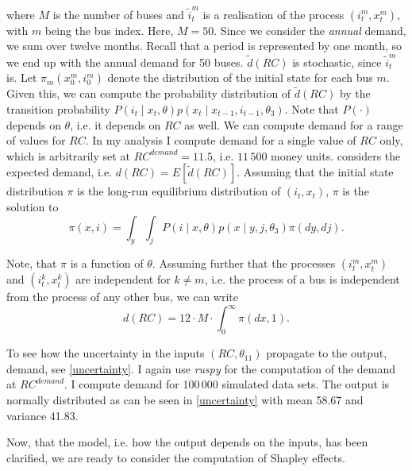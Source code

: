\noindent where $M$ is the number of buses and ${\tilde{i}}_t^m$ is a realisation of the process $(i_t^m, x_t^m)$, with $m$ being the bus index. Here, $M=50$. Since we consider the \textit{annual} demand, we sum over twelve months. Recall that a period is represented by one month, so we end up with the annual demand for 50 buses. $\tilde{d}(RC)$ is stochastic, since ${\tilde{i}}_t^m$ is. Let $\pi_m(x_0^m, i_0^m)$ denote the distribution of the initial state for each bus $m$. Given this, we can compute the probability distribution of $\tilde{d}(RC) $ by the transition probability $P(i_t \mid x_t, \theta)p(x_t \mid x_{t-1}, i_{t-1}, \theta_3) $. Note that $P(\cdot)$ depends on $\theta$, i.e. it depends on $RC$ as well. We can compute demand for a range of values for $RC$. In my analysis I compute demand for a single value of $RC$ only, which is arbitrarily set at $RC^{demand}=11.5$, i.e. $11\,500$ money units. \citet{R87} considers the expected demand, i.e. $d(RC)=E[\tilde{d}(RC)]$. Assuming that the initial state distribution $\pi$ is the long-run equilibrium distribution of $(i_t, x_t)$, $\pi$ is the solution to
\begin{equation*}
\pi(x, i)=\int_y \int_j P(i \mid x, \theta) p(x \mid y, j, \theta_3) \pi(dy, dj).
\end{equation*}

Note, that $\pi$ is a function of $\theta$. Assuming further that the processes $ (i_t^m, x_t^m)$ and $(i_t^k, x_t^k)$ are independent for $k \neq m$, i.e. the process of a bus is independent from the process of any other bus, we can write
\begin{equation*}
d(RC)=12 \cdot M \cdot \int_0^{\infty} \pi(dx, 1).
\end{equation*}

To see how the uncertainty in the inputs $(RC, \theta_{11})$ propagate to the output, demand, see \cref{uncertainty}. I again use \textit{ruspy} for the computation of the demand at $RC^{demand}$. I compute demand for $100\,000$ simulated data sets. The output is normally distributed as can be seen in \cref{uncertainty} with mean 58.67 and variance 41.83.

Now, that the model, i.e. how the output depends on the inputs, has been clarified, we are ready to consider the computation of Shapley effects.
